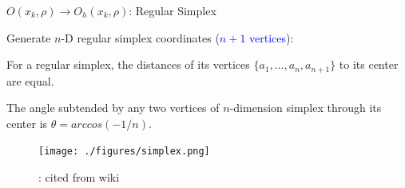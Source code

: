 \documentclass{beamer}
\begin{document}
\begin{frame}{$O(x_k, \rho)\rightarrow O_h(x_k, \rho)$: Regular Simplex}

\begin{itemize}
	\footnotesize{
	\item Generate $n$-D regular simplex coordinates
		(\textcolor{blue}{$n+1$ vertices}):
		}
	\begin{enumerate}
		\scriptsize{
		\item For a regular simplex, the distances of its vertices
			$\{a_1,\dots,a_n,a_{n+1}\}$ to its center are equal.
		\item The angle subtended by any two vertices of
			$n$-dimension simplex through its center is
			$\theta=arccos(-1/n)$.  }
	\begin{figure}[!htbp]
		\centering
		  \texttt{[image: ./figures/simplex.png]}
		  \caption{: \scriptsize{cited from wiki}}
	\end{figure}
	\end{enumerate}
\end{itemize}
\end{frame}
\end{document}
